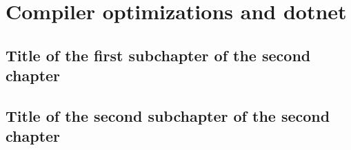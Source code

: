 \chapter{Compiler optimizations and dotnet}



\section{Title of the first subchapter of the second chapter}

\section{Title of the second subchapter of the second chapter}
